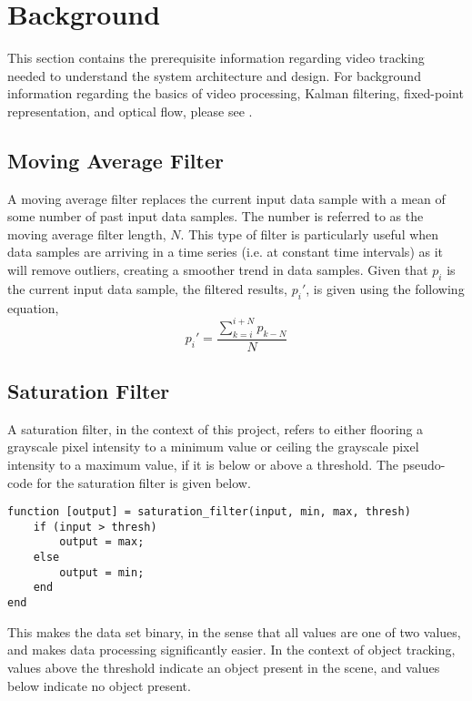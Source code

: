 \documentclass[11pt]{article} %
\begin{document}
\section{Background}
This section contains the prerequisite information regarding video tracking needed to understand the system architecture and design. For background information regarding the basics of video processing, Kalman filtering, fixed-point representation, and optical flow, please see \cite{15}.
\subsection{Moving Average Filter}
A moving average filter replaces the current input data sample with a mean of some number of past input data samples. The number is referred to as the moving average filter length, $N$. This type of filter is particularly useful when data samples are arriving in a time series (i.e. at constant time intervals) as it will remove outliers, creating a smoother trend in data samples. Given that $p_i$ is the current input data sample, the filtered results, $p_i'$, is given using the following equation,
\begin{equation}
p_i' = \frac{\sum_{k = i}^{i + N} p_{k-N}}{N}
\end{equation}
\subsection{Saturation Filter}
A saturation filter, in the context of this project, refers to either flooring a grayscale pixel intensity to a minimum value or ceiling the grayscale pixel intensity to a maximum value, if it is below or above a threshold. The pseudo-code for the saturation filter is given below.
\begin{lstlisting}
function [output] = saturation_filter(input, min, max, thresh)
	if (input > thresh)
		output = max;
	else
		output = min;
	end
end
\end{lstlisting} 
This makes the data set binary, in the sense that all values are one of two values, and makes data processing significantly easier. In the context of object tracking, values above the threshold indicate an object present in the scene, and values below indicate no object present.
\end{document}
